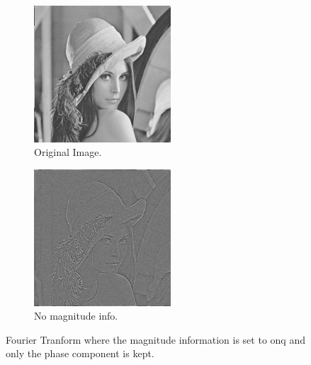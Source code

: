 \documentclass[letter]{article}
\begin{document}
\begin{figure}[hbtp]
  \centering
  \begin{subfigure}{5.1cm}
    \includegraphics[width=5.1cm]{images/lenna.png}
    \caption{Original Image.}
  \end{subfigure}
  \begin{subfigure}{5.1cm}
    \includegraphics[width=5.1cm]{images/lenna_phase_only.png}
    \caption{No magnitude info.}
  \end{subfigure}
  \caption{Fourier Tranform where the magnitude information is set to onq and only the phase component is kept.}
  \label{fig:ft_phase}
\end{figure}
\end{document}
